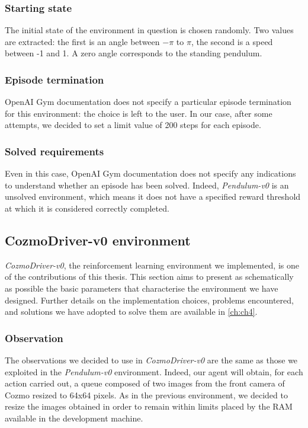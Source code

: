 \subsubsection{Starting state}

The initial state of the environment in question is chosen randomly.
Two values are extracted: the first is an angle between  $-\pi$ to $\pi$, the second is a speed between -1 and 1.
A zero angle corresponds to the standing pendulum.

\subsubsection{Episode termination}

OpenAI Gym documentation does not specify a particular episode termination for this environment: the choice is left to the user.
In our case, after some attempts, we decided to set a limit value of 200 steps for each episode.

\subsubsection{Solved requirements}

Even in this case, OpenAI Gym documentation does not specify any indications to understand whether an episode has been solved.
Indeed, \textit{Pendulum-v0} is an unsolved environment, which means it does not have a specified reward threshold at which it is considered correctly completed.

\subsection{CozmoDriver-v0 environment}

\textit{CozmoDriver-v0}, the reinforcement learning environment we implemented, is one of the contributions of this thesis.
This section aims to present as schematically as possible the basic parameters that characterise the environment we have designed.
Further details on the implementation choices, problems encountered, and solutions we have adopted to solve them are available in \vref{ch:ch4}.

\subsubsection{Observation}

The observations we decided to use in \textit{CozmoDriver-v0} are the same as those we exploited in the \textit{Pendulum-v0} environment.
Indeed, our agent will obtain, for each action carried out, a queue composed of two images from the front camera of Cozmo resized to 64x64 pixels.
As in the previous environment, we decided to resize the images obtained in order to remain within limits placed by the RAM available in the development machine.

